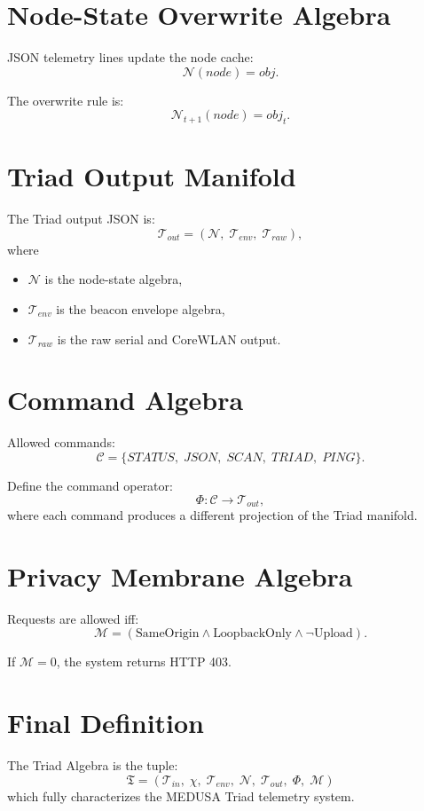 \documentclass[11pt]{article}
\begin{document}
\section{Node-State Overwrite Algebra}
JSON telemetry lines update the node cache:
\[
\mathcal{N}(node) = obj.
\]

The overwrite rule is:
\[
\mathcal{N}_{t+1}(node) = obj_t.
\]

\section{Triad Output Manifold}
The Triad output JSON is:
\[
\mathcal{T}_{out}
= (\mathcal{N},\; \mathcal{T}_{env},\; \mathcal{T}_{raw}),
\]
where
\begin{itemize}
\item $\mathcal{N}$ is the node-state algebra,
\item $\mathcal{T}_{env}$ is the beacon envelope algebra,
\item $\mathcal{T}_{raw}$ is the raw serial and CoreWLAN output.
\end{itemize}

\section{Command Algebra}
Allowed commands:
\[
\mathcal{C} = \{STATUS,\; JSON,\; SCAN,\; TRIAD,\; PING\}.
\]

Define the command operator:
\[
\Phi : \mathcal{C} \to \mathcal{T}_{out},
\]
where each command produces a different projection of the Triad manifold.

\section{Privacy Membrane Algebra}
Requests are allowed iff:
\[
\mathcal{M}
= (\text{SameOrigin} \land \text{LoopbackOnly} \land \neg\text{Upload}).
\]

If $\mathcal{M}=0$, the system returns HTTP 403.

\section{Final Definition}
The Triad Algebra is the tuple:
\[
\boxed{
\mathfrak{T} =
(\mathcal{T}_{in},\;
\chi,\;
\mathcal{T}_{env},\;
\mathcal{N},\;
\mathcal{T}_{out},\;
\Phi,\;
\mathcal{M})
}
\]
which fully characterizes the MEDUSA Triad telemetry system.
\end{document}
